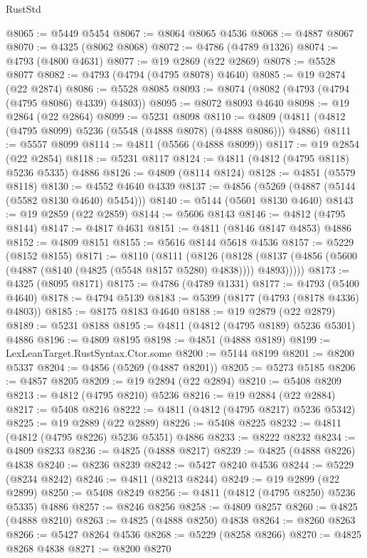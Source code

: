 \begin{lexlean}{RustStd}
\begin{coremodule}
@8065 := @5449 @5454
@8067 := @8064 @8065 @4536
@8068 := @4887 @8067
@8070 := @4325 (@8062 @8068)
@8072 := @4786 (@4789 @1326)
@8074 := @4793 (@4800 @4631)
@8077 := @19 @2869 (@22 @2869)
@8078 := @5528 @8077
@8082 := @4793 (@4794 (@4795 @8078) @4640)
@8085 := @19 @2874 (@22 @2874)
@8086 := @5528 @8085
@8093 := @8074 (@8082 (@4793 (@4794 (@4795 @8086) @4339) @4803))
@8095 := @8072 @8093 @4640
@8098 := @19 @2864 (@22 @2864)
@8099 := @5231 @8098
@8110 := @4809 (@4811 (@4812 (@4795 @8099) @5236 (@5548 (@4888 @8078) (@4888 @8086))) @4886)
@8111 := @5557 @8099
@8114 := @4811 (@5566 (@4888 @8099))
@8117 := @19 @2854 (@22 @2854)
@8118 := @5231 @8117
@8124 := @4811 (@4812 (@4795 @8118) @5236 @5335) @4886
@8126 := @4809 (@8114 @8124)
@8128 := @4851 (@5579 @8118)
@8130 := @4552 @4640 @4339
@8137 := @4856 (@5269 (@4887 (@5144 (@5582 @8130 @4640) @5454)))
@8140 := @5144 (@5601 @8130 @4640)
@8143 := @19 @2859 (@22 @2859)
@8144 := @5606 @8143
@8146 := @4812 (@4795 @8144)
@8147 := @4817 @4631
@8151 := @4811 (@8146 @8147 @4853) @4886
@8152 := @4809 @8151
@8155 := @5616 @8144 @5618 @4536
@8157 := @5229 (@8152 @8155)
@8171 := @8110
    (@8111
      (@8126
        (@8128 (@8137 (@4856 (@5600 (@4887 (@8140 (@4825 (@5548 @8157 @5280) @4838)))) @4893)))))
@8173 := @4325 (@8095 @8171)
@8175 := @4786 (@4789 @1331)
@8177 := @4793 (@5400 @4640)
@8178 := @4794 @5139
@8183 := @5399 (@8177 (@4793 (@8178 @4336) @4803))
@8185 := @8175 @8183 @4640
@8188 := @19 @2879 (@22 @2879)
@8189 := @5231 @8188
@8195 := @4811 (@4812 (@4795 @8189) @5236 @5301) @4886
@8196 := @4809 @8195
@8198 := @4851 (@4888 @8189)
@8199 := LexLeanTarget.RustSyntax.Ctor.some
@8200 := @5144 @8199
@8201 := @8200 @5337
@8204 := @4856 (@5269 (@4887 @8201))
@8205 := @5273 @5185
@8206 := @4857 @8205
@8209 := @19 @2894 (@22 @2894)
@8210 := @5408 @8209
@8213 := @4812 (@4795 @8210) @5236
@8216 := @19 @2884 (@22 @2884)
@8217 := @5408 @8216
@8222 := @4811 (@4812 (@4795 @8217) @5236 @5342)
@8225 := @19 @2889 (@22 @2889)
@8226 := @5408 @8225
@8232 := @4811 (@4812 (@4795 @8226) @5236 @5351) @4886
@8233 := @8222 @8232
@8234 := @4809 @8233
@8236 := @4825 (@4888 @8217)
@8239 := @4825 (@4888 @8226) @4838
@8240 := @8236 @8239
@8242 := @5427 @8240 @4536
@8244 := @5229 (@8234 @8242)
@8246 := @4811 (@8213 @8244)
@8249 := @19 @2899 (@22 @2899)
@8250 := @5408 @8249
@8256 := @4811 (@4812 (@4795 @8250) @5236 @5335) @4886
@8257 := @8246 @8256
@8258 := @4809 @8257
@8260 := @4825 (@4888 @8210)
@8263 := @4825 (@4888 @8250) @4838
@8264 := @8260 @8263
@8266 := @5427 @8264 @4536
@8268 := @5229 (@8258 @8266)
@8270 := @4825 @8268 @4838
@8271 := @8200 @8270

\end{coremodule}
\end{lexlean}
